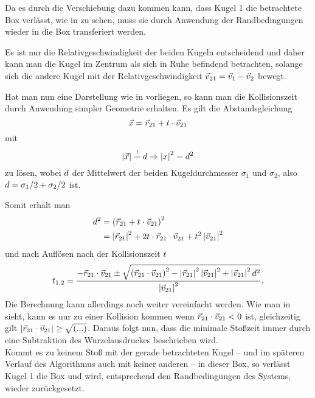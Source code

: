 

Da es durch die Verschiebung dazu kommen kann, dass Kugel 1 die betrachtete Box verlässt, wie in  zu sehen, muss sie durch Anwendung der Randbedingungen wieder in die Box transferiert werden.



Es ist nur die Relativgeschwindigkeit der beiden Kugeln entscheidend und daher kann man die Kugel im Zentrum als sich in Ruhe befindend betrachten, solange sich die andere Kugel mit der Relativgeschwindigkeit $\vec{v}_{21}=\vec{v}_1-\vec{v}_2$ bewegt.
 


Hat man nun eine Darstellung wie in  vorliegen, so kann man die Kollisionszeit durch Anwendung simpler Geometrie erhalten.
Es gilt die Abstandsgleichung 
\begin{equation}
	\vec{x} = \vec{r}_{21} + t\cdot\vec{v}_{21}
\end{equation}
mit 
\begin{equation}
	\left|\vec{x}\right| \overset{!}{=} d \Rightarrow \left|x\right|^2 = d^2
\end{equation}
zu lösen, wobei $d$ der Mittelwert der beiden Kugeldurchmesser $\sigma_1$ und $\sigma_2$, also $d=\sigma_1/2 + \sigma_2/2$ ist.

Somit erhält man
\begin{align}
	d^2	&= \left(\vec{r}_{21} + t\cdot\vec{v}_{21} \right)^2 \\
			&= \left|\vec{r}_{21}\right|^2 + 2t\cdot\vec{r}_{21}\cdot\vec{v}_{21} + t^2\left|\vec{v}_{21}\right|^2
\end{align}
und nach Auflösen nach der Kollisionszeit $t$
\begin{equation}
	t_{1,2}=\frac{-\vec{r}_{21}\cdot\vec{v}_{21} \pm \sqrt{\left(\vec{r}_{21}\cdot\vec{v}_{21}\right)^2 - \left|\vec{r}_{21}\right|^2\left|\vec{v}_{21}\right|^2 + \left|\vec{v}_{21}\right|^2d^2}}{\left|\vec{v}_{21}\right|^2}.
\end{equation}
Die Berechnung kann allerdings noch weiter vereinfacht werden. Wie man in  sieht, kann es nur zu einer Kollision kommen wenn $\vec{r}_{21}\cdot\vec{v}_{21} < 0$ ist, gleichzeitig gilt $\left|\vec{r}_{21}\cdot\vec{v}_{21}\right| \geq \sqrt{(...)}$. Daraus folgt nun, dass die minimale Stoßzeit immer durch eine Subtraktion des Wurzelausdruckes beschrieben wird.\\
Kommt es zu keinem Stoß mit der gerade betrachteten Kugel -- und im späteren Verlauf des Algorithmus auch mit keiner anderen -- in dieser Box, so verlässt Kugel 1 die Box und wird, entsprechend den Randbedingungen des Systems, wieder zurückgesetzt.